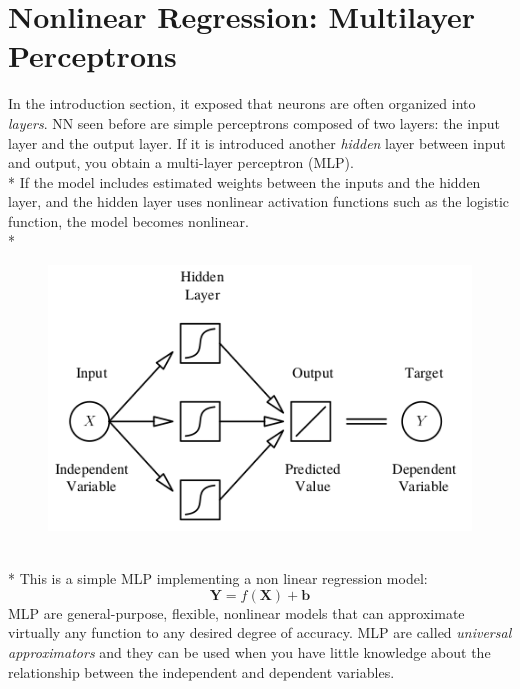 \documentclass[10pt,a4paper]{article}
\begin{document}
	\section{Nonlinear Regression: Multilayer Perceptrons}
	In the introduction section, it exposed that neurons are often organized into \emph{layers}. NN seen before are simple perceptrons composed of two layers: the input layer and the output layer. If it is introduced another \emph{hidden} layer between input and output, you obtain a multi-layer perceptron (MLP).\\*
	If the model includes estimated weights between the inputs and the hidden layer, and the hidden layer uses nonlinear activation functions such as the logistic function, the model becomes nonlinear.\\*
		\begin{figure}[h!]
		\centering
		\includegraphics[scale=2.5]{img/nonlinreg}
	\end{figure}\\*
	This is a simple MLP implementing a non linear regression model:
	$$
	\textbf{Y} = f(\textbf{X}) + \textbf{b}
	$$
	MLP are general-purpose, flexible, nonlinear models that can approximate
	virtually any function to any desired degree of accuracy. MLP are called \emph{universal approximators} and they can be used when you have little knowledge about the relationship between the independent and dependent variables.
\end{document}
